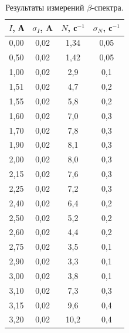 \documentclass[a4paper,12pt]{article} %
\begin{document}
	
		\begin{table}[H]
			\caption{Результаты измерений $\beta$-спектра.}
			\label{table:exp1}
			\begin{tabular}{|c|c|c|c|}
				\hline
				$I$, А & $\sigma_I$, A & $N$, с$^{-1}$ & $\sigma_N$, с$^{-1}$ \\ \hline
				0,00   & 0,02          & 1,34          & 0,05                 \\ \hline
				0,50   & 0,02          & 1,42          & 0,05                 \\ \hline
				1,00   & 0,02          & 2,9           & 0,1                  \\ \hline
				1,51   & 0,02          & 4,7           & 0,2                  \\ \hline
				1,55   & 0,02          & 5,8           & 0,2                  \\ \hline
				1,60   & 0,02          & 7,0           & 0,3                  \\ \hline
				1,70   & 0,02          & 7,8           & 0,3                  \\ \hline
				1,90   & 0,02          & 8,1           & 0,3                  \\ \hline
				2,00   & 0,02          & 8,0           & 0,3                  \\ \hline
				2,15   & 0,02          & 7,6           & 0,3                  \\ \hline
				2,25   & 0,02          & 7,2           & 0,3                  \\ \hline
				2,40   & 0,02          & 6,4           & 0,2                  \\ \hline
				2,50   & 0,02          & 5,2           & 0,2                  \\ \hline
				2,60   & 0,02          & 4,4           & 0,2                  \\ \hline
				2,75   & 0,02          & 3,5           & 0,1                  \\ \hline
				2,90   & 0,02          & 3,3           & 0,1                  \\ \hline
				3,00   & 0,02          & 3,8           & 0,1                  \\ \hline
				3,10   & 0,02          & 7,3           & 0,3                  \\ \hline
				3,15   & 0,02          & 9,6           & 0,4                  \\ \hline
				3,20   & 0,02          & 10,2          & 0,4                  \\ \hline

\end{tabular}
\end{table}
\end{document}
